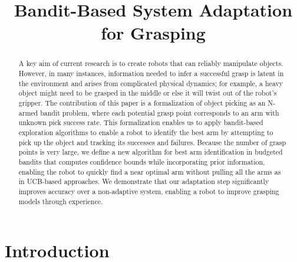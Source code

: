 \documentclass{article}
\title{Bandit-Based System Adaptation for Grasping}
\author{}
\begin{document}
\maketitle

\begin{abstract}
A key aim of current research is to create robots that can reliably
manipulate objects.  However, in many instances, information needed to
infer a successful grasp is latent in the environment and arises from
complicated physical dynamics; for example, a heavy object might need
to be grasped in the middle or else it will twist out of the robot's
gripper.  The contribution of this paper is a formalization of object
picking as an N-armed bandit problem, where each potential grasp point
corresponds to an arm with unknown pick success rate.  This
formalization enables us to apply bandit-based exploration algorithms
to enable a robot to identify the best arm by attempting to pick up
the object and tracking its successes and failures.  Because the
number of grasp points is very large, we define a new algorithm for
best arm identification in budgeted bandits that computes confidence
bounds while incorporating prior information, enabling the robot to
quickly find a near optimal arm without pulling all the arms as in
UCB-based approaches.  We demonstrate that our adaptation step
significantly improves accuracy over a non-adaptive system, enabling a
robot to improve grasping models through experience.





\end{abstract}



\section{Introduction}
\end{document}
